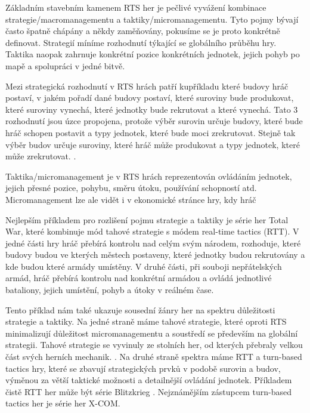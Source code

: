 Základním stavebním kamenem RTS her je pečlivé vyvážení kombinace strategie/macromanagementu a taktiky/micromanagementu. Tyto pojmy bývají často špatně chápány a někdy zaměňovány, pokusíme se je proto konkrétně definovat. Strategií míníme  rozhodnutí týkající se globálního průběhu hry. Taktika  naopak zahrnuje konkrétní pozice konkrétních jednotek, jejich pohyb po mapě a spolupráci v jedné bitvě.  

Mezi strategická rozhodnutí v RTS hrách patří kupříkladu které budovy hráč postaví, v jakém pořadí dané budovy postaví, které suroviny bude produkovat, které suroviny vynechá, které jednotky bude rekrutovat a které vynechá.  Tato 3 rozhodnutí jsou úzce propojena, protože výběr surovin určuje budovy, které bude hráč schopen postavit a typy jednotek, které bude moci zrekrutovat. Stejně tak výběr budov určuje suroviny, které hráč může produkovat a typy jednotek, které může zrekrutovat. . 

Taktika/micromanagement je v RTS hrách reprezentován ovládáním jednotek, jejich přesné pozice, pohybu, směru útoku, používání schopností atd. Micromanagement lze ale vidět i v ekonomické stránce hry, kdy hráč 

Nejlepším příkladem pro rozlišení pojmu strategie a taktiky je série her Total War, které kombinuje mód tahové strategie s módem real-time tactics (RTT). V jedné části hry hráč přebírá kontrolu nad celým svým národem, rozhoduje, které budovy budou ve kterých městech postaveny, které jednotky budou rekrutovány a kde budou které armády umístěny. V druhé části, při souboji nepřátelských armád, hráč přebírá kontrolu nad konkrétní armádou a ovládá jednotlivé bataliony, jejich umístění, pohyb a útoky v reálném čase.

Tento příklad nám také ukazuje sousední žánry her na spektru důležitosti strategie a taktiky. Na jedné straně máme tahové strategie, které oproti RTS minimalizují důležitost micromanagementu a soustředí se především na globální strategii. Tahové strategie se vyvinuly ze stolních her, od kterých přebraly velkou část svých herních mechanik. \cite{https://web.archive.org/web/20081201113349/http://archive.gamespy.com/articles/february02/strat04/index.shtm}. Na druhé straně spektra máme RTT a turn-based tactics hry, které se zbavují strategických prvků v podobě surovin a budov, výměnou za větší taktické možnosti a detailnější ovládání jednotek. Příkladem čistě RTT her může být série Blitzkrieg . Nejznámějším zástupcem turn-based tactics her je série her X-COM.  

